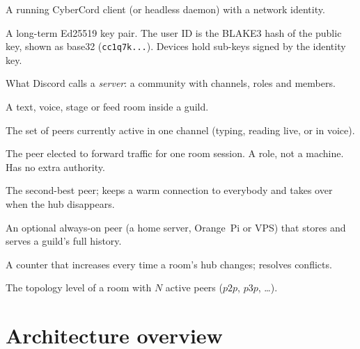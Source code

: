 \documentclass[11pt,a4paper]{article}
\begin{document}
\begin{description}[style=nextline,leftmargin=2.2em,font=\sffamily\bfseries\color{ccskyd}]
  \item[Peer] A running CyberCord client (or headless daemon) with a network identity.
  \item[Identity] A long-term Ed25519 key pair. The user ID is the BLAKE3 hash of the
        public key, shown as base32 (\texttt{cc1q7k...}). Devices hold sub-keys signed by
        the identity key.
  \item[Guild] What Discord calls a \emph{server}: a community with channels, roles and members.
  \item[Channel] A text, voice, stage or feed room inside a guild.
  \item[Room session] The set of peers currently active in one channel (typing, reading
        live, or in voice).
  \item[Virtual Hub] The peer elected to forward traffic for one room session. A role,
        not a machine. Has no extra authority.
  \item[Standby] The second-best peer; keeps a warm connection to everybody and takes over
        when the hub disappears.
  \item[Keeper] An optional always-on peer (a home server, Orange~Pi or VPS) that stores
        and serves a guild's full history.
  \item[Epoch] A counter that increases every time a room's hub changes; resolves conflicts.
  \item[$pNp$] The topology level of a room with $N$ active peers ($p2p$, $p3p$, \dots).
\end{description}

\needspace{9cm}
\section{Architecture overview}
\end{document}
